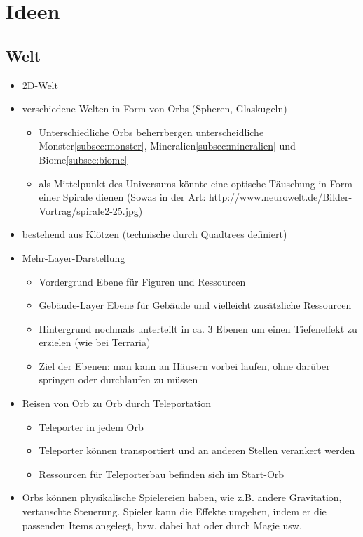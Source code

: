 \section{Ideen}
\label{sec:ideen}

\subsection{Welt}
\label{subsec:welt}
\begin{itemize}
	\item 2D-Welt
	\item verschiedene Welten in Form von Orbs (Spheren, Glaskugeln)
	\begin{itemize}
		\item Unterschiedliche Orbs beherrbergen unterscheidliche Monster\ref{subsec:monster}, Mineralien\ref{subsec:mineralien} und Biome\ref{subsec:biome}
		\item als Mittelpunkt des Universums könnte eine optische Täuschung in Form einer Spirale dienen (Sowas in der Art: http://www.neurowelt.de/Bilder-Vortrag/spirale2-25.jpg)
	\end{itemize}
	\item bestehend aus Klötzen (technische durch Quadtrees definiert)
	\item Mehr-Layer-Darstellung
	\begin{itemize}
		\item Vordergrund
			\subitem Ebene für Figuren und Ressourcen
		\item Gebäude-Layer
			\subitem Ebene für Gebäude und vielleicht zusätzliche Ressourcen
		\item Hintergrund
			\subitem nochmals unterteilt in ca. 3 Ebenen um einen Tiefeneffekt zu erzielen (wie bei Terraria)
		\item Ziel der Ebenen: man kann an Häusern vorbei laufen, ohne darüber springen oder durchlaufen zu müssen
	\end{itemize}
	\item Reisen von Orb zu Orb durch Teleportation
	\begin{itemize}
		\item Teleporter in jedem Orb
		\item Teleporter können transportiert und an anderen Stellen verankert werden
		\item Ressourcen für Teleporterbau befinden sich im Start-Orb
	\end{itemize}
	\item Orbs können physikalische Spielereien haben, wie z.B. andere Gravitation, vertauschte Steuerung. Spieler kann die Effekte umgehen, indem er die passenden Items angelegt, bzw. dabei hat oder durch Magie usw.
\end{itemize}
    
